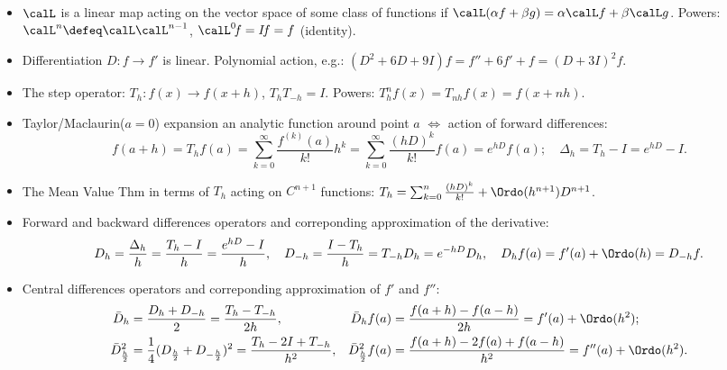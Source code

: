 \documentclass[a4paper]{article}
\begin{document}
\begin{itemize}

   \item $\calL$ is a linear map acting on the vector space of some class of functions if
     $\calL (\alpha f+\beta g)=\alpha\calL f+\beta\calL g$.
     Powers: $\calL^n\defeq\calL\calL^{n-1}$,
     $\calL^0\!f=I\!f=f$ (identity).

  \item Differentiation $D\!:\!f\to f'$ is linear.
  Polynomial action, e.g.: $(D^2+6D+9I)f=f''+6f'+f=(D+3I)^2f$.

  \item The step operator: $T_h\!:f(x)\to f(x+h)$,
    $T_hT_{-h}=I$. Powers: $T^n_hf(x)=T_{nh}f(x)=f(x+nh)$.

  \item Taylor/Maclaurin($a=0$) expansion an analytic function around  point $a$
    $\iff$
    action of forward differences:
    \[
      f(a+h)
      =T_hf(a)
      =\sum_{k=0}^\infty\frac{f^{(k)}(a)}{k!}h^k
      =\sum_{k=0}^\infty\frac{(hD)^k}{k!}f(a)
      = e^{hD}f(a); \quad
      \Delta_h=T_h-I=e^{hD}-I.
    \]

  \item The Mean Value Thm in terms of $T_h$ acting on $C^{n+1}$ functions:
    $
     T_h = \sum_{k=0}^n\frac{(hD)^k}{k!}
      + \Ordo(h^{n+1})D^{n+1}
    $.

  \item Forward and backward
    differences operators and correponding
    approximation of the derivative:
    \[
      D_h=\frac{\Delta_h}{h}=\frac{T_h-I}{h}=\frac{e^{hD}-I}{h},\quad
      D_{-h} =\frac{I-T_h}{h} = T_{-h}D_h=e^{-hD}D_h,
      \quad
      D_hf(a)=f'(a) + \Ordo(h)=D_{-h}f.
    \]

  \item Central
    differences operators and correponding
    approximation of $f'$ and $f''$:
    \begin{align*}
      \bar D_h
      &= \frac{D_h+D_{-h}}{2}
      = \frac{T_h-T_{-h}}{2h},
      &
      \bar D_hf(a)
      &= \frac{f(a+h)-f(a-h)}{2h}
      = f'(a) + \Ordo(h^2);
      \\
      \bar D_{\frac h2}^2
      &= \frac14(D_{\frac h2}+D_{-\frac h2})^2
      = \frac{T_h-2I+T_{-h}}{h^2},
      &
      \bar D_{\frac h2}^2f(a)
       &= \frac{f(a+h)-2f(a)+f(a-h)}{h^2}
        = f''(a) + \Ordo(h^2).
    \end{align*}


\end{itemize}
\end{document}

